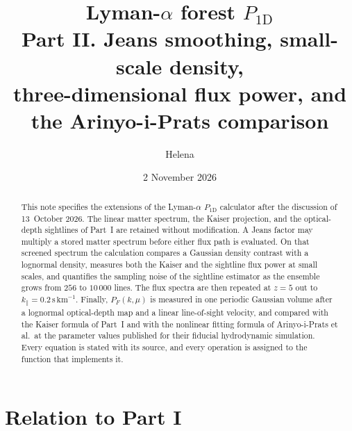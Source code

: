 \documentclass[11pt]{article}
\title{Lyman-$\alpha$ forest $P_{1\mathrm{D}}$\\[0.35em]
\large Part II. Jeans smoothing, small-scale density,\\
three-dimensional flux power, and the Arinyo-i-Prats comparison}
\author{Helena}
\date{2 November 2026}
\begin{document}
\maketitle

\begin{abstract}
This note specifies the extensions of the Lyman-$\alpha$ $P_{1\mathrm{D}}$ calculator after the discussion of 13~October 2026.
The linear matter spectrum, the Kaiser projection, and the optical-depth sightlines of Part~I are retained without modification.
A Jeans factor may multiply a stored matter spectrum before either flux path is evaluated.
On that screened spectrum the calculation compares a Gaussian density contrast with a lognormal density, measures both the Kaiser and the sightline flux power at small scales, and quantifies the sampling noise of the sightline estimator as the ensemble grows from $256$ to $10\,000$ lines.
The flux spectra are then repeated at $z=5$ out to $k_\parallel=0.2\,\mathrm{s\,km}^{-1}$.
Finally, $P_F(k,\mu)$ is measured in one periodic Gaussian volume after a lognormal optical-depth map and a linear line-of-sight velocity, and compared with the Kaiser formula of Part~I and with the nonlinear fitting formula of Arinyo-i-Prats et al.\ at the parameter values published for their fiducial hydrodynamic simulation.
Every equation is stated with its source, and every operation is assigned to the function that implements it.
\end{abstract}

\section{Relation to Part I}
\label{sec:relation}
\end{document}
